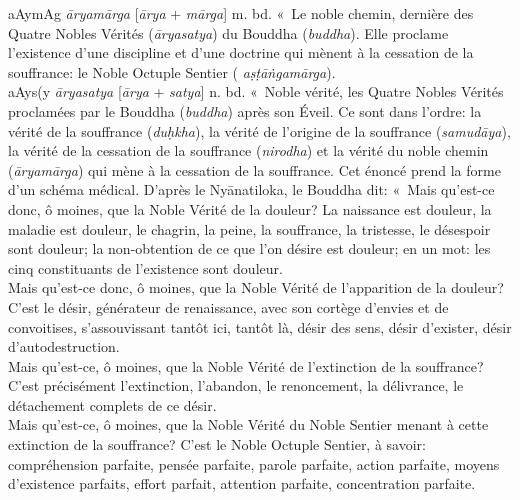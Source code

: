 \documentclass[a4paper,11pt,twocolumn]{article}
\begin{document}
{\dn aAy\0mAg\0} {\em \={a}ryam\={a}rga} [{\em \={a}rya} + {\em
m\={a}rga}] m. bd. «~Le noble chemin\fg, dernière des Quatre
Nobles Vérités ({\em \={a}ryasatya}) du Bouddha ({\em buddha}). Elle
proclame l'existence d'une discipline et d'une doctrine qui mènent à
la cessation de la souffrance: le Noble Octuple Sentier ({\em
a\d{s}\d{t}\={a}\.{n}gam\={a}rga}). \\

{\dn aAy\0s(y} {\em \={a}ryasatya} [{\em \={a}rya} + {\em satya}] n.
bd. «~Noble vérité\fg, les Quatre Nobles Vérités proclamées par
le Bouddha ({\em buddha}) après son Éveil. Ce sont dans
l'ordre: la vérité de la souffrance ({\em du\d{h}kha}), la vérité
de l'origine de la souffrance ({\em samud\={a}ya}), la
vérité de la cessation de la souffrance ({\em nirodha}) et la
vérité du noble chemin ({\em \={a}ryam\={a}rga}) qui mène à la
cessation de la souffrance. Cet énoncé prend la forme d'un schéma
médical. D'après le Ny\={a}natiloka, le Bouddha dit: «~Mais qu'est-ce
donc, ô moines, que la Noble Vérité de la douleur? La naissance est
douleur, la maladie est douleur, le chagrin, la peine, la souffrance, la
tristesse, le désespoir sont douleur; la non-obtention de ce que l'on
désire est douleur; en un mot: les cinq constituants de l'existence
sont douleur. \\
Mais qu'est-ce donc, ô moines, que la Noble Vérité de l'apparition de
la douleur? C'est le désir, générateur de renaissance, avec son
cortège d'envies et de convoitises, s'assouvissant tantôt ici, tantôt
là, désir des sens, désir d'exister, désir d'autodestruction. \\
Mais qu'est-ce, ô moines, que la Noble Vérité de l'extinction de la
souffrance? C'est précisément l'extinction, l'abandon, le
renoncement, la délivrance, le détachement complets de ce désir. \\
Mais qu'est-ce, ô moines, que la Noble Vérité du Noble Sentier menant
à cette extinction de la souffrance? C'est le Noble Octuple Sentier, à
savoir: compréhension parfaite, pensée parfaite, parole parfaite,
action parfaite, moyens d'existence parfaits, effort parfait,
attention parfaite, concentration parfaite.\fg  \\
\end{document}
